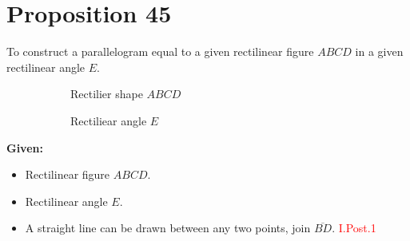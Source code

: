 
\section*{Proposition 45}

\renewcommand\qedsymbol{Q.E.F}

\begin{con}
To construct a parallelogram equal to a given rectilinear figure $ABCD$ in a given rectilinear angle $E$.
\end{con}

\begin{figure}[H]
	\begin{subfigure}{0.3\textwidth}
		\caption{Rectilier shape $ABCD$}
	\end{subfigure}
	\begin{subfigure}{0.3\textwidth}
		\caption{Rectiliear angle $E$}
	\end{subfigure}
	\caption{}
\end{figure}

\textbf{Given:}
\begin{itemize}
    \item Rectilinear figure $ABCD$.
    \item Rectilinear angle $E$.
     \item A straight line can be drawn between any two points, join $\overline{BD}$.\hfill\textcolor{red}{ I.Post.1}
\end{itemize}

